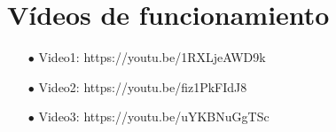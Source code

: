 \documentclass[osajnl,twocolumn,showpacs,superscriptaddress,10pt]{revtex4-1}
\begin{document}
\section{Vídeos de funcionamiento}
\begin{itemize}
    \item[$\bullet$]Video1: https://youtu.be/1RXLjeAWD9k 
    \item[$\bullet$]Video2: https://youtu.be/fiz1PkFIdJ8
    \item[$\bullet$]Video3: https://youtu.be/uYKBNuGgTSc
\end{itemize}
\end{document}
